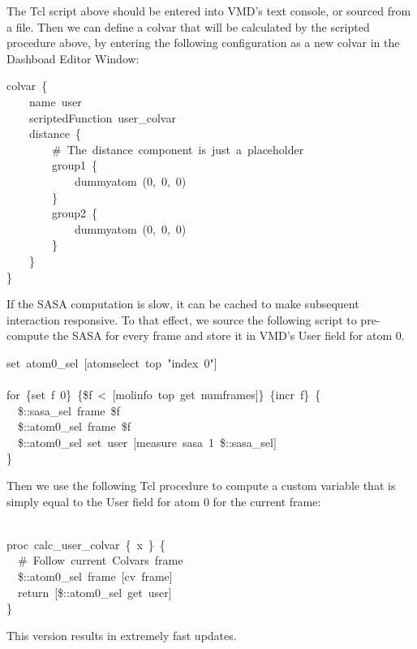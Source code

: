 {The Tcl script above should be entered into VMD's text console, or sourced from a file.
Then we can define a colvar that will be calculated by the scripted procedure above, by entering the following configuration as a new colvar in the Dashboad Editor Window:

\begin{cvexampleinput}
\-colvar~\{\\
\-~~~~name~user\\
\-~~~~scriptedFunction~user\_colvar\\
\-~~~~distance~\{\\
\-~~~~~~~~\#~The~distance~component~is~just~a~placeholder\\
\-~~~~~~~~group1~\{\\
\-~~~~~~~~~~~~dummyatom~(0,~0,~0)\\
\-~~~~~~~~\}\\
\-~~~~~~~~group2~\{\\
\-~~~~~~~~~~~~dummyatom~(0,~0,~0)\\
\-~~~~~~~~\}\\
\-~~~~\}\\
\-\}
\end{cvexampleinput}

If the SASA computation is slow, it can be cached to make subsequent interaction responsive.
To that effect, we source the following script to pre-compute the SASA for every frame and store it in VMD's User field for atom 0.
\begin{mdexampleinput}
\-set~atom0\_sel~[atomselect~top~"index~0"]\\
\-\\
\-for~\{set~f~0\}~\{\$f~<~[molinfo~top~get~numframes]\}~\{incr~f\}~\{\\
\-~~\$::sasa\_sel~frame~\$f\\
\-~~\$::atom0\_sel~frame~\$f\\
\-~~\$::atom0\_sel~set~user~[measure~sasa~1~\$::sasa\_sel]\\
\}
\end{mdexampleinput}


Then we use the following Tcl procedure to compute a custom variable that is simply equal to the User field for atom 0 for the current frame:
\begin{mdexampleinput}
\-\\
\-proc~calc\_user\_colvar~\{~x~\}~\{\\
\-~~\#~Follow~current~Colvars~frame\\
\-~~\$::atom0\_sel~frame~[cv~frame]\\
\-~~return~[\$::atom0\_sel~get~user]\\
\-\}
\end{mdexampleinput}
This version results in extremely fast updates.
} %


